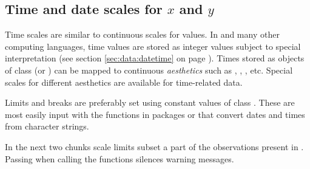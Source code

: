 \documentclass[krantz2]{krantz}\usepackage{knitr}
\begin{document}
\subsection{Time and date scales for $x$ and $y$}\label{sec:plot:scales:time:date}
Time scales are similar to continuous scales for  values. In \Rlang and many other computing languages, time values are stored as integer values subject to special interpretation (see section \ref{sec:data:datetime} on page \pageref{sec:data:datetime}). Times stored as objects of class  (or ) can be mapped to continuous \emph{aesthetics} such as , , , etc. Special scales for different aesthetics are available for time-related data.

Limits and breaks are preferably set using constant values of class . These are most easily input with the functions in packages  or  that convert dates and times from character strings.


\begin{explainbox}
In the next two chunks scale limits subset a part of the observations present in . Passing  when calling the  functions silences warning messages.
\end{explainbox}
\end{document}
